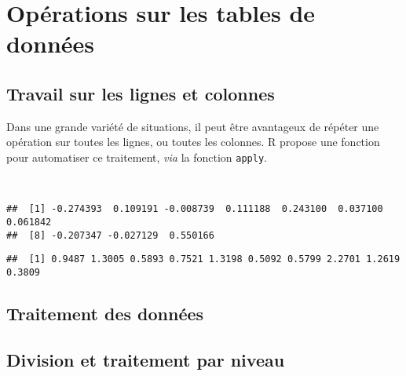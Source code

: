 \chapter{Opérations sur les tables de données}

\section{Travail sur les lignes et colonnes}

Dans une grande variété de situations, il peut être avantageux de répéter une opération sur toutes les lignes, ou toutes les colonnes.
R propose une fonction pour automatiser ce traitement, \emph{via} la fonction \texttt{apply}. 

\begin{knitrout}
\color{fgcolor}\begin{kframe}
\begin{flushleft}
\ttfamily\noindent
{}\hlassignement{=}{\ }\hlkeyword{(}\hlkeyword{(}\hlkeyword{)}\hlkeyword{,}{\ }\hlargument{=}{\ }\hlkeyword{)}\hspace*{\fill}\\
\hlstd{}\hlkeyword{(}\hlkeyword{,}{\ }\hlkeyword{,}{\ }\hlkeyword{)}\mbox{}
\normalfont
\end{flushleft}
\begin{verbatim}
##  [1] -0.274393  0.109191 -0.008739  0.111188  0.243100  0.037100  0.061842
##  [8] -0.207347 -0.027129  0.550166
\end{verbatim}
\begin{flushleft}
\ttfamily\noindent
{}\hlkeyword{(}\hlkeyword{,}{\ }\hlkeyword{,}{\ }\hlkeyword{)}\mbox{}
\normalfont
\end{flushleft}
\begin{verbatim}
##  [1] 0.9487 1.3005 0.5893 0.7521 1.3198 0.5092 0.5799 2.2701 1.2619 0.3809
\end{verbatim}
\end{kframe}
\end{knitrout}


\section{Traitement des données}

\section{Division et traitement par niveau}
